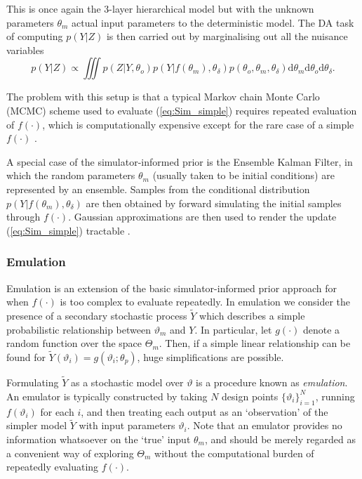 \documentclass[10pt,a4paper]{article}
\newcommand{\intd} {\textrm{d}}
\begin{document}
\newpage
\noindent This is once again the 3-layer hierarchical model but with the unknown parameters $\theta_m$ actual input parameters to the deterministic model. The DA task of computing $p(Y | Z)$ is then carried out by marginalising out all the nuisance variables
\begin{equation}\label{eq:Sim_simple}
p(Y|Z) \propto \iiint p(Z | Y, \theta_o)p(Y |f(\theta_m), \theta_\delta)p(\theta_o, \theta_m, \theta_\delta) \intd \theta_m \intd\theta_o \intd\theta_\delta.
\end{equation}

The problem with this setup is that a typical Markov chain Monte Carlo (MCMC) scheme used to evaluate (\ref{eq:Sim_simple}) requires repeated evaluation of $f(\cdot)$, which is computationally expensive except for the rare case of a simple $f(\cdot)$ \citep{Higdon_2004}. %

A special case of the simulator-informed prior is the Ensemble Kalman Filter, in which the random parameters $\theta_m$ (usually taken to be initial conditions) are represented by an ensemble. Samples from the conditional distribution $p(Y | f(\theta_m),\theta_\delta)$ are then obtained by forward simulating the initial samples through $f(\cdot)$. Gaussian approximations are then used to render the update (\ref{eq:Sim_simple}) tractable \citep{Burgers_1998}. %


\subsubsection*{Emulation}

Emulation is an extension of the basic simulator-informed prior approach for when $f(\cdot)$ is too complex to evaluate repeatedly. In emulation we consider the presence of a secondary stochastic process $\widetilde{Y}$ which describes a simple probabilistic relationship between $\vartheta_m$ and $Y$. In particular, let $g(\cdot)$ denote a random function over the space $\Theta_m$. Then, if a simple linear relationship can be found for $\widetilde{Y}(\vartheta_i) = g(\vartheta_i;\theta_p)$, huge simplifications are possible. 

Formulating $\widetilde{Y}$ as a stochastic model over $\vartheta$ is a procedure known as \emph{emulation}. An emulator is typically constructed by taking $N$ design points $\{\vartheta_i\}_{i=1}^N$, running $f(\vartheta_i)$ for each $i$, and then treating each output as an `observation' of the simpler model $\widetilde{Y}$ with input parameters $\vartheta_i$. Note that an emulator provides no information whatsoever on the `true' input $\theta_m$, and should be merely regarded as a convenient way of exploring $\Theta_m$ without the computational burden of repeatedly evaluating $f(\cdot)$.
\end{document}
